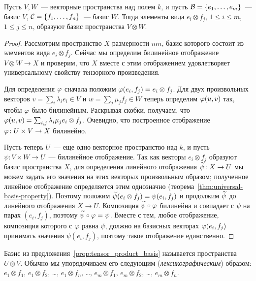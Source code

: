 \begin{proposition}\label{prop:tensor_product_basis}
Пусть $V,W$~--- векторные пространства над полем $k$, и пусть
$\mathcal B=\{e_1,\dots,e_m\}$~--- базис $V$,
$\mathcal C=\{f_1,\dots,f_n\}$~--- базис $W$.
Тогда элементы вида $e_i\otimes f_j$, $1\leq i\leq m$, $1\leq j\leq
n$, образуют базис пространства $V\otimes W$.
\end{proposition}
\begin{proof}
Рассмотрим пространство $X$ размерности $mn$, базис которого состоит
из элементов вида $e_i\otimes f_j$. Сейчас мы определим билинейное
отображение $V\otimes W\to X$ и проверим, что $X$ вместе с этим
отображением удовлетворяет универсальному свойству тензорного
произведения.

Для определения $\varphi$ сначала положим $\varphi(e_i,f_j) = e_i\otimes f_j$.
Для двух произвольных векторов $v = \sum_i\lambda_i e_i\in V$
и $w = \sum_j\mu_j f_j\in W$ теперь определим $\varphi(u,v)$ так,
чтобы $\varphi$ было билинейным. Раскрывая скобки, получаем, что
$\varphi(u,v) = \sum_{i,j}\lambda_i\mu_j e_i\otimes f_j$.
Очевидно, что построенное отображение $\varphi\colon U\times V\to X$
билинейно.

Пусть теперь $U$~--- еще одно векторное пространство над $k$, и пусть
$\psi\colon V\times W\to U$~--- билинейное отображение. Так как
векторы $e_i\otimes f_j$ образуют базис пространства $X$, для
определения линейного отображения $\widetilde\psi\colon X\to U$ мы можем
задать его значения на этих векторых произвольным образом; полученное
линейное отображение определяется этим однозначно
(теорема~\ref{thm:universal-basis-property}).
Поэтому положим $\widetilde\psi(e_i\otimes f_j) = \psi(e_i,f_j)$ и продолжим
$\widetilde\psi$ до линейного отображения $X\to U$. Композиция
$\widetilde\psi\circ\varphi$ билинейна и совпадает с $\psi$ на парах $(e_i,f_j)$,
поэтому $\widetilde\psi\circ\varphi = \psi$. Вместе с тем, любое отображение,
композиция которого с $\varphi$ равна $\psi$, должно на базисных векторах
$\varphi(e_i,f_j)$ принимать значения $\psi(e_i,f_j)$, поэтому такое
отображение единственно.
\end{proof}

\begin{definition}\label{dfn:tensor_basis}
Базис из предложения~\ref{prop:tensor_product_basis} называется
 пространства $U\otimes
V$. Обычно мы
упорядочиваем его следующим ({\em лексикографическим}) образом:
$e_1\otimes f_1$, $e_1\otimes f_2$, \dots, $e_1\otimes f_n$, \dots,
$e_m\otimes f_1$, $e_m\otimes f_2$, \dots, $e_m\otimes f_n$.
\end{definition}

